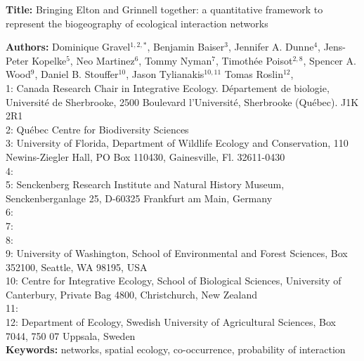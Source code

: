 \documentclass[12pt]{article}
\begin{document}
\linenumbers 
\modulolinenumbers[1]

\textbf{Title:} Bringing Elton and Grinnell together: a quantitative framework to represent the biogeography of ecological interaction networks

\textbf{Authors:} Dominique Gravel$^{1,2,*}$, Benjamin Baiser$^{3}$, Jennifer A. Dunne$^{4}$, Jens-Peter Kopelke$^{5}$, Neo
Martinez$^{6}$, Tommy Nyman$^{7}$, Timoth\'ee Poisot$^{2,8}$,  Spencer A. Wood$^{9}$, Daniel B. Stouffer$^{10}$, Jason Tylianakis$^{10,11}$ Tomas Roslin$^{12}$,\\

1: Canada Research Chair in Integrative Ecology. D\'epartement de
biologie, Universit\'e de Sherbrooke,  2500 Boulevard l'Universit\'e, 
Sherbrooke (Québec).  J1K 2R1\\

2: Qu\'ebec Centre for Biodiversity Sciences\\

3: University of Florida, Department of Wildlife Ecology and Conservation, 110 Newins-Ziegler Hall, PO Box 110430, Gainesville, Fl. 32611-0430 \\

4: \\

5: Senckenberg Research Institute and Natural History Museum, Senckenberganlage 25, D-60325 Frankfurt am Main, Germany\\

6:\\

7:\\

8:\\

9: University of Washington, School of Environmental and Forest Sciences, 
Box 352100, Seattle, WA 98195, USA\\

10: Centre for Integrative Ecology, School of Biological Sciences, University of Canterbury, Private Bag 4800, Christchurch, New Zealand\\

11:\\

12: Department of Ecology, Swedish University of Agricultural Sciences, Box 7044, 750 07 Uppsala, Sweden\\ 

\textbf{Keywords:} networks, spatial ecology, co-occurrence, probability of interaction\\
\end{document}
